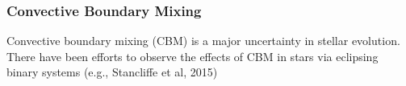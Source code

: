 {\color{purple}
\subsubsection{Convective Boundary Mixing}
}

Convective boundary mixing (CBM) is a major uncertainty in stellar evolution. There have been efforts to observe the effects of CBM in stars via eclipsing binary systems (e.g., Stancliffe et al, 2015)


